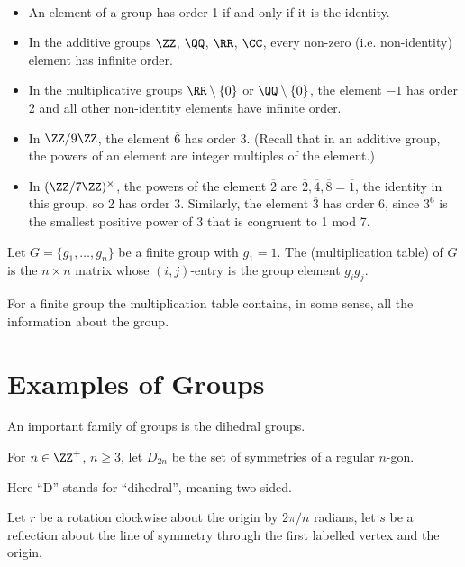 \begin{example} \
\begin{itemize}
\item An element of a group has order 1 if and only if it is the identity.
\item In the additive groups $\ZZ$, $\QQ$, $\RR$, $\CC$, every non-zero (i.e. non-identity) element has infinite order.
\item In the multiplicative groups $\RR\setminus\{0\}$ or $\QQ\setminus\{0\}$, the element $-1$ has order 2 and all other non-identity elements have infinite order.
\item In $\ZZ/9\ZZ$, the element $\overline{6}$ has order 3. (Recall that in an additive group, the powers of an element are integer multiples of the element.)
\item In $(\ZZ/7\ZZ)^\times$, the powers of the element $\overline{2}$ are $\overline{2},\overline{4},\overline{8}=\overline{1}$, the identity in this group, so 2 has order 3. Similarly, the element $\overline{3}$ has order 6, since $3^6$ is the smallest positive power of 3 that is congruent to 1 mod 7.
\end{itemize}
\end{example}

\begin{definition}
Let $G=\{g_1,\dots,g_n\}$ be a finite group with $g_1=1$. The  (multiplication table) of $G$ is the $n\times n$ matrix whose $(i,j)$-entry is the group element $g_ig_j$.
\end{definition}

For a finite group the multiplication table contains, in some sense, all the information about the group.

\section{Examples of Groups}
An important family of groups is the dihedral groups.

\begin{definition}
For $n\in\ZZ^+$, $n\ge3$, let $D_{2n}$ be the set of symmetries of a regular $n$-gon.
\end{definition}

\begin{remark}
Here ``D'' stands for ``dihedral'', meaning two-sided.
\end{remark}

Let $r$ be a rotation clockwise about the origin by $2\pi/n$ radians, let $s$ be a reflection about the line of symmetry through the first labelled vertex and the origin.

